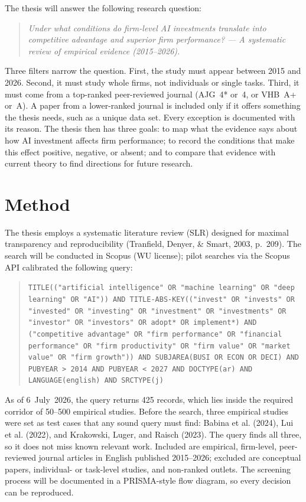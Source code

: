 \documentclass[12pt, a4paper]{article}
\begin{document}
The thesis will answer the following research question:

\begin{quote}
\emph{Under what conditions do firm-level AI investments translate into
competitive advantage and superior firm performance? --- A systematic review of
empirical evidence (2015--2026).}
\end{quote}

Three filters narrow the question. First, the study must appear between 2015
and 2026. Second, it must study whole firms, not individuals or single tasks.
Third, it must come from a top-ranked peer-reviewed journal (AJG~4* or~4, or
VHB~A+ or~A). A paper from a lower-ranked journal is included only if it offers
something the thesis needs, such as a unique data set. Every exception is
documented with its reason. The thesis then has three goals: to map what the
evidence says about how AI investment affects firm performance; to record the
conditions that make this effect positive, negative, or absent; and to compare
that evidence with current theory to find directions for future research.

\section{Method}

The thesis employs a systematic literature review (SLR) designed for maximal
transparency and reproducibility (Tranfield, Denyer, \& Smart, 2003,
p.~209).
The search will be conducted in Scopus (WU license); pilot searches via the
Scopus API calibrated the following query:

\begin{quote}\small\raggedright
\texttt{TITLE(("artificial intelligence" OR "machine learning" OR "deep
learning" OR "AI")) AND TITLE-ABS-KEY(("invest" OR "invests" OR "invested" OR
"investing" OR "investment" OR "investments" OR "investor" OR "investors" OR
adopt* OR implement*) AND ("competitive advantage" OR "firm performance" OR
"financial performance" OR "firm productivity" OR "firm value" OR "market
value" OR "firm growth")) AND SUBJAREA(BUSI OR ECON OR DECI) AND PUBYEAR > 2014
AND PUBYEAR < 2027 AND DOCTYPE(ar) AND LANGUAGE(english) AND SRCTYPE(j)}
\end{quote}

\noindent As of 6~July~2026, the query returns 425 records, which lies inside
the required corridor of 50--500 empirical studies. Before the search, three
empirical studies were set as test cases that any sound query must find:
Babina et al. (2024), Lui et al. (2022), and Krakowski, Luger, and Raisch
(2023). The query finds all three, so it does not miss known relevant work. Included are empirical, firm-level, peer-reviewed journal
articles in English published 2015--2026; excluded are conceptual papers,
individual- or task-level studies, and non-ranked outlets. The screening
process will be documented in a PRISMA-style flow diagram, so every decision
can be reproduced.
\end{document}
